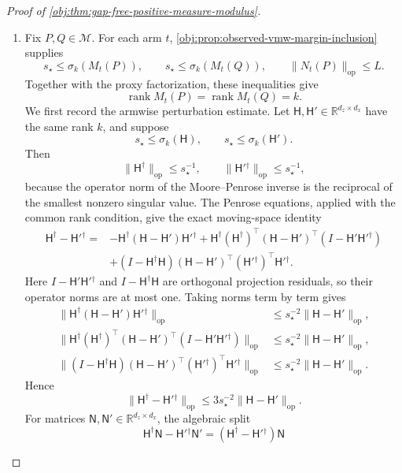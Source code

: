 \begin{proof}[Proof of \cref{obj:thm:gap-free-positive-measure-modulus}]
\begin{enumerate}
\item Fix \(P,Q\in\mathcal M\).  For each arm \(t\), \cref{obj:prop:observed-vmw-margin-inclusion} supplies
\[
s_\star\le\sigma_k(M_t(P)),
\qquad
s_\star\le\sigma_k(M_t(Q)),
\qquad
\|N_t(P)\|_{\mathrm{op}}\le L .
\]
Together with the proxy factorization, these inequalities give
\[
\operatorname{rank}M_t(P)=\operatorname{rank}M_t(Q)=k .
\]
We first record the armwise perturbation estimate.  Let \(\mathsf H,\mathsf H'\in\mathbb R^{d_z\times d_x}\) have the same rank \(k\), and suppose
\[
s_\star\le \sigma_k(\mathsf H),
\qquad
s_\star\le \sigma_k(\mathsf H') .
\]
Then
\[
\|\mathsf H^\dagger\|_{\mathrm{op}}\le s_\star^{-1},
\qquad
\|\mathsf H'{}^\dagger\|_{\mathrm{op}}\le s_\star^{-1},
\]
because the operator norm of the Moore--Penrose inverse is the reciprocal of the smallest nonzero singular value.  The Penrose equations, applied with the common rank condition, give the exact moving-space identity
\[
\begin{aligned}
\mathsf H^\dagger-\mathsf H'{}^\dagger
={}&-\mathsf H^\dagger(\mathsf H-\mathsf H')\mathsf H'{}^\dagger
+\mathsf H^\dagger(\mathsf H^\dagger)^\top
  (\mathsf H-\mathsf H')^\top(I-\mathsf H'\mathsf H'{}^\dagger)\\
&+(I-\mathsf H^\dagger\mathsf H)(\mathsf H-\mathsf H')^\top
  (\mathsf H'{}^\dagger)^\top\mathsf H'{}^\dagger .
\end{aligned}
\]
Here \(I-\mathsf H'\mathsf H'{}^\dagger\) and \(I-\mathsf H^\dagger\mathsf H\) are orthogonal projection residuals, so their operator norms are at most one.  Taking norms term by term gives
\[
\begin{aligned}
\|\mathsf H^\dagger(\mathsf H-\mathsf H')\mathsf H'{}^\dagger\|_{\mathrm{op}}
&\le s_\star^{-2}\|\mathsf H-\mathsf H'\|_{\mathrm{op}},\\
\|\mathsf H^\dagger(\mathsf H^\dagger)^\top
  (\mathsf H-\mathsf H')^\top(I-\mathsf H'\mathsf H'{}^\dagger)\|_{\mathrm{op}}
&\le s_\star^{-2}\|\mathsf H-\mathsf H'\|_{\mathrm{op}},\\
\|(I-\mathsf H^\dagger\mathsf H)(\mathsf H-\mathsf H')^\top
  (\mathsf H'{}^\dagger)^\top\mathsf H'{}^\dagger\|_{\mathrm{op}}
&\le s_\star^{-2}\|\mathsf H-\mathsf H'\|_{\mathrm{op}}.
\end{aligned}
\]
Hence
\[
\|\mathsf H^\dagger-\mathsf H'{}^\dagger\|_{\mathrm{op}}
\le
3s_\star^{-2}\|\mathsf H-\mathsf H'\|_{\mathrm{op}} .
\]
For matrices \(\mathsf N,\mathsf N'\in\mathbb R^{d_z\times d_x}\), the algebraic split
\[
\mathsf H^\dagger\mathsf N-\mathsf H'{}^\dagger\mathsf N'
=
(\mathsf H^\dagger-\mathsf H'{}^\dagger)\mathsf N
\]
\end{enumerate}
\end{proof}
